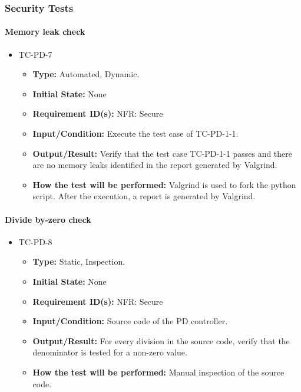 \documentclass[12pt, titlepage]{article}
\begin{document}
\subsubsection{Security Tests}

\paragraph{Memory leak check}
\begin{itemize}
\item{TC-PD-7\\}
\begin{itemize}
\item{\textbf{Type:}} Automated, Dynamic.
					
\item{\textbf{Initial State:}} None

\item{\textbf{Requirement ID(s):}} NFR: Secure
					
\item{\textbf{Input/Condition:}}  Execute the test case of TC-PD-1-1.
					
\item{\textbf{Output/Result:}} Verify that the test case TC-PD-1-1 passes and there
are no memory leaks identified in the  report generated by Valgrind.

\item{\textbf{How the test will be performed:}} Valgrind \cite{Valgrind} is used to fork
the python script. After the execution, a report is generated by Valgrind. 
\end{itemize}
\end{itemize}

\paragraph{Divide by-zero check}
\begin{itemize}
\item{TC-PD-8\\}
\begin{itemize}
\item{\textbf{Type:}} Static, Inspection.
					
\item{\textbf{Initial State:}} None

\item{\textbf{Requirement ID(s):}}  NFR: Secure
					
\item{\textbf{Input/Condition:}}  Source code of the PD controller.
					
\item{\textbf{Output/Result:}} For every division in the source code, verify that
the denominator is tested for a non-zero value. 

\item{\textbf{How the test will be performed:}}  Manual inspection of the source code.
\end{itemize}
\end{itemize}
\end{document}
